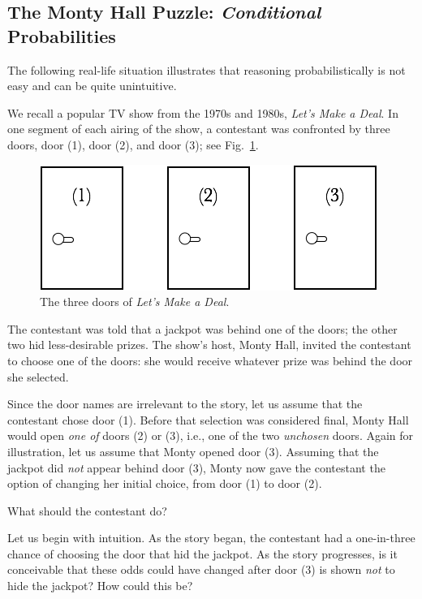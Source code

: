 \subsection{The Monty Hall Puzzle: {\em Conditional} Probabilities}
\label{sec:monty-hall}

The following real-life situation illustrates that reasoning
probabilistically is not easy and can be quite unintuitive.

We recall a popular TV show from the 1970s and 1980s, \textit{Let's
  Make a Deal}. In one segment of each airing of the show, a
contestant was confronted by three doors, door (1), door (2), and door
(3); see Fig.~\ref{fig:MonthyHal-1}.
\begin{figure}[htb]
\begin{center}
        \includegraphics[scale=0.4]{FiguresMaths/MonthyHallInitial}
        \caption{The three doors of \textit{Let's Make a Deal}.}
        \label{fig:MonthyHal-1}
\end{center}
\end{figure}
The contestant was told that a jackpot was behind one of the doors;
the other two hid less-desirable prizes.  The show's host, Monty Hall,
invited the contestant to choose one of the doors:
she would receive whatever prize was behind the door she selected.

Since the door names are irrelevant to the story, let us assume that
the contestant chose door (1).  Before that selection was considered
final, Monty Hall would open {\em one of} doors (2) or (3), i.e., one
of the two {\em unchosen} doors.  Again for illustration, let us
assume that Monty opened door (3).  Assuming that the jackpot did {\em not} appear 
behind door (3), Monty now gave the contestant the
option of changing her initial choice, from door (1) to door (2).

What should the contestant do?  

Let us begin with intuition.  As the story began, the contestant had a
one-in-three chance of choosing the door that hid the jackpot.  As the
story progresses, is it conceivable that these odds could have changed after door
(3) is shown {\em not} to hide the jackpot?  How could this be?

